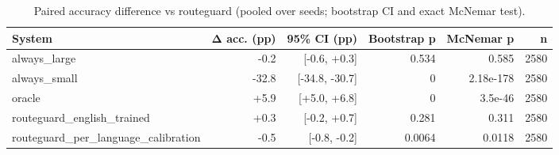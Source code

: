 \begin{table}[t]
\centering
\small
\caption{Paired accuracy difference vs routeguard (pooled over seeds; bootstrap CI and exact McNemar test).}
\label{tab:significance}
\begin{tabular}{lrrrrr}
\toprule
System & Δ acc. (pp) & 95\% CI (pp) & Bootstrap p & McNemar p & n \\
\midrule
always\_large & -0.2 & [-0.6, +0.3] & 0.534 & 0.585 & 2580 \\
always\_small & -32.8 & [-34.8, -30.7] & 0 & 2.18e-178 & 2580 \\
oracle & +5.9 & [+5.0, +6.8] & 0 & 3.5e-46 & 2580 \\
routeguard\_english\_trained & +0.3 & [-0.2, +0.7] & 0.281 & 0.311 & 2580 \\
routeguard\_per\_language\_calibration & -0.5 & [-0.8, -0.2] & 0.0064 & 0.0118 & 2580 \\
\bottomrule
\end{tabular}
\end{table}

